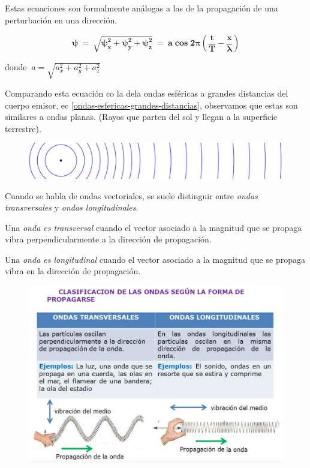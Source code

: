 Estas ecuaciones son formalmente análogas a las de la propagación de una perturbación en una dirección.

$$\boldsymbol{\psi\ =\ \sqrt{\psi_x^2+\psi_y^2+\psi_z^2}\ =\ a \cos 2 \pi \left( \dfrac t T - \dfrac x \lambda \right) }$$

donde $ \ a=\sqrt{a_x^2+a_y^2+a_z^2}$

Comparando esta ecuación co la dela ondas esféricas a grandes distancias del cuerpo emisor, ec \ref{ondas-esfericas-grandes-distancias}, observamos que estas son similares a ondas planas. (Rayos que parten del sol y llegan a la superficie terrestre).

\begin{figure}[H]
		\centering
		\includegraphics[width=.75\textwidth]{imagenes/imagenes21/T21IM05.png}
	\end{figure}

Cuando se habla de ondas vectoriales, se suele distinguir entre \emph{ondas transversales} y \emph{ondas longitudinales}.

Una \emph{onda es transversal} cuando el vector asociado a la magnitud que se propaga vibra perpendicularmente a la dirección de propagación.

Una \emph{onda es longitudinal} cuando el vector asociado a la magnitud que se propaga vibra en la dirección de propagación.

\begin{figure}[H]
		\centering
		\includegraphics[width=.9\textwidth]{imagenes/imagenes21/T21IM06.png}
	\end{figure}
	

